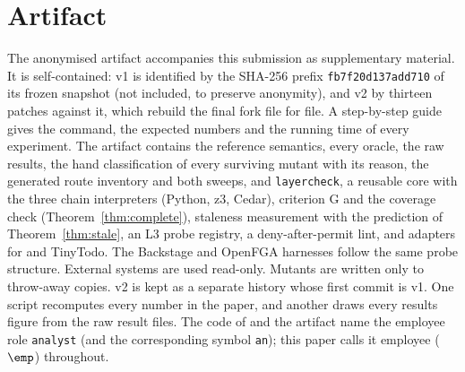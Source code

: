 \section{Artifact}
\label{app:artifact}
The anonymised artifact accompanies this submission as supplementary material. It is self-contained: v1 is identified by the SHA-256 prefix \texttt{fb7f20d137add710} of its frozen
snapshot (not included, to preserve anonymity), and v2 by thirteen patches against it, which rebuild the final fork
file for file. A step-by-step guide gives the command, the expected numbers and the running time of every
experiment. The artifact contains the reference semantics, every oracle, the raw results, the hand classification
of every surviving mutant with its reason, the generated route inventory and both sweeps, and \texttt{layercheck}, a reusable
core with the three chain interpreters (Python, z3, Cedar), criterion G and the coverage check
(Theorem~\ref{thm:complete}), staleness measurement with the prediction of Theorem~\ref{thm:stale}, an L3 probe
registry, a deny-after-permit lint, and adapters for \chain and TinyTodo. The Backstage and OpenFGA harnesses follow
the same probe structure. External systems are used read-only. Mutants are written only to throw-away copies. v2
is kept as a separate history whose first commit is v1. One script recomputes every number in the paper, and
another draws every results figure from the raw result files. The code of \sysname and the artifact name the
employee role \texttt{analyst} (and the corresponding symbol \texttt{an}); this paper calls it employee
($\emp$) throughout.


